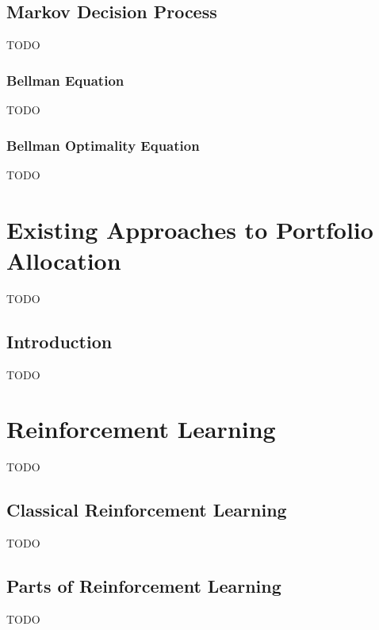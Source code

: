 \section{Markov Decision Process}\label{sec:markov-decision-process}
TODO

\subsection{Bellman Equation}\label{subsec:bellman-equation}
TODO

\subsection{Bellman Optimality Equation}\label{subsec:bellman-optimality-equation}
TODO



\chapter{Existing Approaches to Portfolio Allocation}\label{ch:existing-approaches-to-portfolio-allocation}
TODO


\section{Introduction}\label{sec:introduction}
TODO




\chapter{Reinforcement Learning}\label{ch:reinforcement-learning}
TODO


\section{Classical Reinforcement Learning}\label{sec:classical-reinforcement-learning}
TODO


\section{Parts of Reinforcement Learning}\label{sec:parts-of-reinforcement-learning}
TODO


